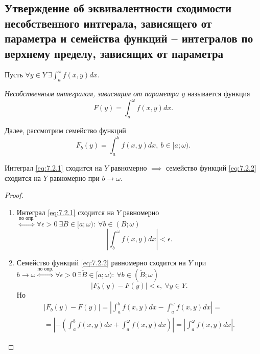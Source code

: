 \setcounter{subsection}{109}

\subsection{Утверждение об эквивалентности сходимости несобственного интгерала, зависящего от параметра и семейства функций – интегралов по верхнему пределу, зависящих от параметра}

\begin{definition}
    Пусть $ \forall y \in Y \ \exists \int_{a}^{\omega}f(x,y)dx $.

    \emph{Несобственным интегралом, зависящим от параметра $ y $} называется функция
    \begin{equation}\label{eq:7.2.1}
        F(y) = \int_{a}^{\omega}f(x,y)dx.
    \end{equation}
\end{definition}

\begin{note}
    Далее, рассмотрим семейство функций
    \begin{equation}\label{eq:7.2.2}
        F_b(y) = \int_{a}^{b}f(x,y)dx, \ b \in [a;\omega).
    \end{equation}
\end{note}

\begin{statement}
    Интеграл \ref{eq:7.2.1} сходится на $ Y $ равномерно $ \implies $ семейство функций \ref{eq:7.2.2} сходится на $ Y $ равномерно при $ b \rightarrow \omega $.
\end{statement}

\begin{proof}\leavevmode
    \begin{enumerate}
        \item Интеграл \ref{eq:7.2.1} сходится на $ Y $ равномерно $ \overset{\text{по опр.}}{\iff} \forall \epsilon > 0 \ \exists B \in [a;\omega): \ \forall b \in (B;\omega) $
              \[
                  \left|\int_{b}^{\omega}f(x,y)dx\right| < \epsilon.
              \]
        \item Семейство функций \ref{eq:7.2.2} равномерно сходится на $ Y $ при $ b \rightarrow \omega \overset{\text{по опр.}}{\iff} \forall \epsilon > 0 \ \exists \widetilde{B} \in [a;\omega): \ \forall b \in (\widetilde{B};\omega) $
              \[
                  \big|F_b(y) - F(y)\big| < \epsilon, \ \forall y \in Y.
              \]
              Но
              \begin{multline*}
                  \big|F_b(y) - F(y)\big| = \left|\int_{a}^{b}f(x,y)dx - \int_{a}^{\omega}f(x,y)dx\right| = \\
                  = \left|-\left(\int_{a}^{b}f(x,y)dx + \int_{a}^{\omega}f(x,y)dx\right)\right| = \left|\int_{a}^{\omega}f(x,y)dx\right|.
              \end{multline*}
    \end{enumerate}
\end{proof}

